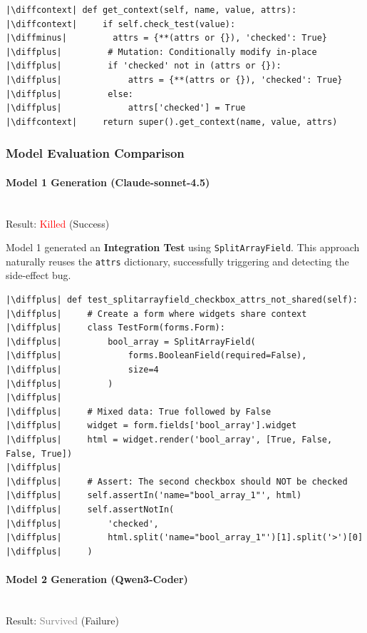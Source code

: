 \documentclass[11pt]{article}
\newcommand{\diffminus}{\textcolor{red}{-}}         %
\newcommand{\diffplus}{\textcolor{green!70!black}{+}} %
\newcommand{\diffcontext}{\phantom{+}}              %
\begin{document}
\begin{verbatim}
|\diffcontext| def get_context(self, name, value, attrs):
|\diffcontext|     if self.check_test(value):
|\diffminus|         attrs = {**(attrs or {}), 'checked': True}
|\diffplus|         # Mutation: Conditionally modify in-place
|\diffplus|         if 'checked' not in (attrs or {}):
|\diffplus|             attrs = {**(attrs or {}), 'checked': True}
|\diffplus|         else:
|\diffplus|             attrs['checked'] = True
|\diffcontext|     return super().get_context(name, value, attrs)
\end{verbatim}

\subsubsection{Model Evaluation Comparison}

\paragraph{Model 1 Generation (Claude-sonnet-4.5)}
\mbox{}\\
Result: \textcolor{red}{Killed} (Success)

Model 1 generated an \textbf{Integration Test} using \texttt{SplitArrayField}. This approach naturally reuses the \texttt{attrs} dictionary, successfully triggering and detecting the side-effect bug.

\begin{verbatim}
|\diffplus| def test_splitarrayfield_checkbox_attrs_not_shared(self):
|\diffplus|     # Create a form where widgets share context
|\diffplus|     class TestForm(forms.Form):
|\diffplus|         bool_array = SplitArrayField(
|\diffplus|             forms.BooleanField(required=False), 
|\diffplus|             size=4
|\diffplus|         )
|\diffplus|
|\diffplus|     # Mixed data: True followed by False
|\diffplus|     widget = form.fields['bool_array'].widget
|\diffplus|     html = widget.render('bool_array', [True, False, False, True])
|\diffplus|
|\diffplus|     # Assert: The second checkbox should NOT be checked
|\diffplus|     self.assertIn('name="bool_array_1"', html)
|\diffplus|     self.assertNotIn(
|\diffplus|         'checked', 
|\diffplus|         html.split('name="bool_array_1"')[1].split('>')[0]
|\diffplus|     )
\end{verbatim}

\paragraph{Model 2 Generation (Qwen3-Coder)}
\mbox{}\\
Result: \textcolor{gray}{Survived} (Failure)
\end{document}
